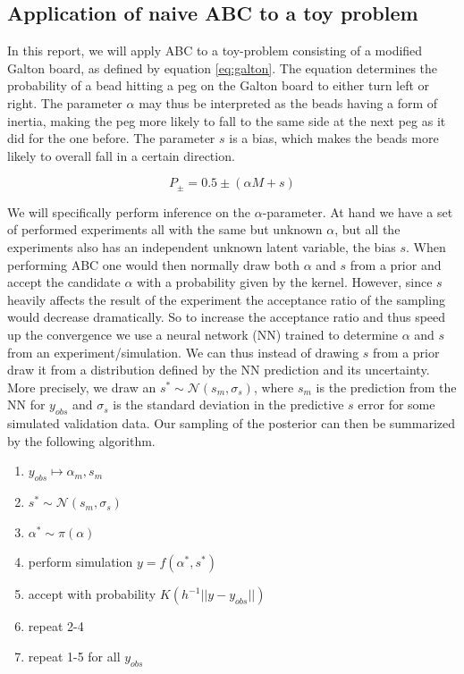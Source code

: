 \documentclass[11pt,a4paper]{article}
\begin{document}
\subsection{Application of naive ABC to a toy problem}

In this report, we will apply ABC to a toy-problem consisting of a modified Galton board, as defined by equation \eqref{eq:galton}. The equation determines the probability of a bead hitting a peg on the Galton board to either turn left or right. The parameter $\alpha$ may thus be interpreted as the beads having a form of inertia, making the peg more likely to fall to the same side at the next peg as it did for the one before. The parameter $s$ is a bias, which makes the beads more likely to overall fall in a certain direction. 

\begin{equation}
    \label{eq:galton}
    P_{\pm} = 0.5 \pm \left(\alpha M + s \right)
\end{equation}

We will specifically perform inference on the $\alpha$-parameter. At hand we have a set of performed experiments all with the same but unknown $\alpha$, but all the experiments also has an independent unknown latent variable, the bias $s$. When performing ABC one would then normally draw both $\alpha$ and $s$ from a prior and accept the candidate $\alpha$ with a probability given by the kernel. However, since $s$ heavily affects the result of the experiment the acceptance ratio of the sampling would decrease dramatically. So to increase the acceptance ratio and thus speed up the convergence we use a neural network (NN) trained to determine $\alpha$ and $s$ from an experiment/simulation. We can thus instead of drawing $s$ from a prior draw it from a distribution defined by the NN prediction and its uncertainty. More precisely, we draw an $s^* \sim \mathcal{N}(s_m, \sigma_s)$, where $s_m$ is the prediction from the NN for $y_{obs}$ and $\sigma_s$ is the standard deviation in the predictive $s$ error for some simulated validation data. Our sampling of the posterior can then be summarized by the following algorithm. 
\begin{enumerate}
    \item $y_{obs} \mapsto \alpha_m, s_m$
    \item $s^* \sim \mathcal{N}(s_m, \sigma_s)$
    \item $\alpha^* \sim \pi(\alpha)$
    \item perform simulation $y = f(\alpha^*, s^*)$
    \item accept with probability $K(h^{-1}||y - y_{obs}||)$
    \item repeat 2-4
    \item repeat 1-5 for all $y_{obs}$
\end{enumerate}
\end{document}
